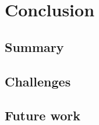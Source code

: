 \chapter{Conclusion\label{cha:chapter5}}
\section{Summary}
\section{Challenges}
\section{Future work}
